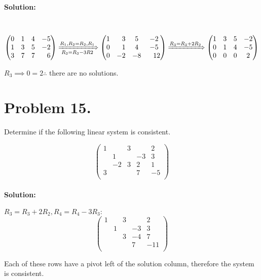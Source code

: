 \documentclass[11pt, notitlepage]{report}
\newenvironment{solution}{\paragraph{\small Solution:}}{\hfill}
\begin{document}
\begin{solution} \
\[
\left(\begin{matrix}{}
  0& 1& 4&-5  \\
  1& 3& 5&-2  \\
  3& 7& 7&\phantom{-}6  \\
\end{matrix}\right)
\xRightarrow[R_3=R_3-3R2]{R_1,R_2=R_2,R_1}
\left(\begin{matrix}{}
  1& \phantom{-}3& 5&-2  \\
  0& \phantom{-}1& 4&-5  \\
  0& -2& -8&\phantom{-}12  \\
\end{matrix}\right)
\xRightarrow{R_3=R_3+2R_2}
\left(\begin{matrix}{}
  1& 3& 5&-2  \\
  0& 1& 4&-5  \\
  0& 0& 0&2  \\
\end{matrix}\right)\]

$R_3 \implies 0=2 \therefore$ there are no solutions.

\end{solution}



\section{Problem 15.} 

Determine if the following linear system is consistent.

\[\left(\begin{matrix}{}
  1& & 3&&2  \\
  & 1& &-3&3  \\
  & -2& 3&2&1  \\
  3&  & &7&-5  \\
\end{matrix}\right)\]

\begin{solution}
$R_3=R_3 + 2 R_2, R_4=R_4-3R_3:$
\[\left(\begin{matrix}{}
  1& & 3&&2  \\
  & 1& &-3&3  \\
  & & 3&-4&7  \\
  &  & &7&-11  \\
\end{matrix}\right)\]

Each of these rows have a pivot left of the solution column, therefore the system is consistent.
\end{solution}
\end{document}

